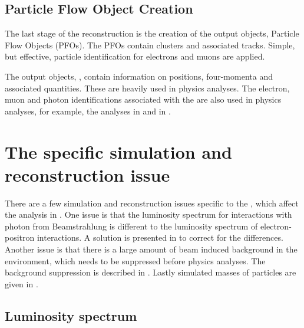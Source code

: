 \subsection{Particle Flow Object Creation}
\label{sec:pandoraPFOcreation}

The last stage of the reconstruction is the creation of the output objects, Particle Flow Objects (PFOs). The PFOs contain clusters and associated tracks. Simple, but effective, particle identification for electrons and muons are applied.

The output objects, \PFOs, contain information on positions, four-momenta and associated quantities. These \PFOs are heavily used  in physics analyses. The electron, muon and photon identifications associated with the \PFOs are  also used in physics analyses, for example, the analyses in  and in .


\section{The \CLIC specific simulation and reconstruction issue}

There are a few  simulation and reconstruction issues specific to the \CLIC, which affect the analysis in . One issue is that the luminosity spectrum for  interactions with photon from Beamstrahlung is different to the luminosity spectrum of electron-positron interactions. A solution is presented in  to correct for the differences. Another issue is that there is a large amount of beam induced background in the \CLIC environment, which needs to be suppressed before physics analyses. The background suppression is described in . Lastly simulated masses of particles are given in .





\subsection{Luminosity spectrum}
\label{sec:pandoraCLUClumi}


